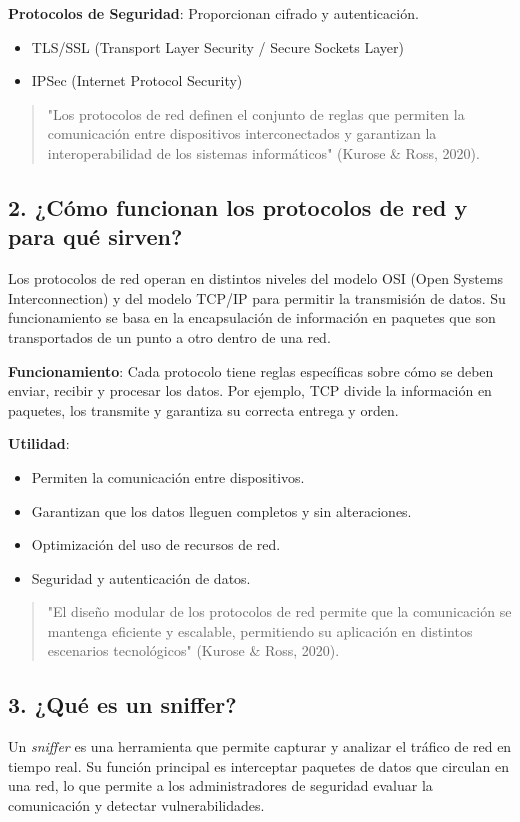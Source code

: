 \textbf{Protocolos de Seguridad}: Proporcionan cifrado y autenticación.
\begin{itemize}
    \item TLS/SSL (Transport Layer Security / Secure Sockets Layer)
    \item IPSec (Internet Protocol Security)
\end{itemize}

\begin{quote}
    "Los protocolos de red definen el conjunto de reglas que permiten la comunicación entre dispositivos interconectados y garantizan la interoperabilidad de los sistemas informáticos" (Kurose \& Ross, 2020).
\end{quote}

\subsection{2. ¿Cómo funcionan los protocolos de red y para qué sirven?}
Los protocolos de red operan en distintos niveles del modelo OSI (Open Systems Interconnection) y del modelo TCP/IP para permitir la transmisión de datos. Su funcionamiento se basa en la encapsulación de información en paquetes que son transportados de un punto a otro dentro de una red.

\textbf{Funcionamiento}: Cada protocolo tiene reglas específicas sobre cómo se deben enviar, recibir y procesar los datos. Por ejemplo, TCP divide la información en paquetes, los transmite y garantiza su correcta entrega y orden.

\textbf{Utilidad}:
\begin{itemize}
    \item Permiten la comunicación entre dispositivos.
    \item Garantizan que los datos lleguen completos y sin alteraciones.
    \item Optimización del uso de recursos de red.
    \item Seguridad y autenticación de datos.
\end{itemize}

\begin{quote}
    "El diseño modular de los protocolos de red permite que la comunicación se mantenga eficiente y escalable, permitiendo su aplicación en distintos escenarios tecnológicos" (Kurose \& Ross, 2020).
\end{quote}

\subsection{3. ¿Qué es un sniffer?}
Un \textit{sniffer} es una herramienta que permite capturar y analizar el tráfico de red en tiempo real. Su función principal es interceptar paquetes de datos que circulan en una red, lo que permite a los administradores de seguridad evaluar la comunicación y detectar vulnerabilidades.

